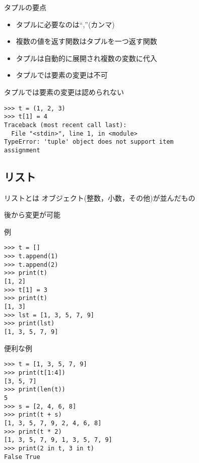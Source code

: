 \documentclass[12pt, xetex, xcolor=pdftex, dvipsnames]{beamer}
\begin{document}
\begin{frame}{タプルの要点}
    \begin{itemize}
        \item タプルに必要なのは``,''(カンマ)
        \item 複数の値を返す関数はタプルを一つ返す関数
        \item タプルは自動的に展開され複数の変数に代入
        \item \alert{タプルでは要素の変更は不可}
    \end{itemize}
\end{frame}
\begin{frame}[fragile]
    \alert{タプルでは要素の変更は認められない}
\begin{lstlisting}
>>> t = (1, 2, 3)
>>> t[1] = 4
Traceback (most recent call last):
  File "<stdin>", line 1, in <module>
TypeError: 'tuple' object does not support item
assignment
\end{lstlisting}
\end{frame}

\subsection{リスト}
\begin{frame}{リストとは}
    オブジェクト(整数，小数，その他)が並んだもの

    後から変更が可能
\end{frame}
\begin{frame}[fragile]{例}
    \begin{lstlisting}
>>> t = []
>>> t.append(1)
>>> t.append(2)
>>> print(t)
[1, 2]
>>> t[1] = 3
>>> print(t)
[1, 3]
>>> lst = [1, 3, 5, 7, 9]
>>> print(lst)
[1, 3, 5, 7, 9]
    \end{lstlisting}
\end{frame}
\begin{frame}[fragile]{便利な例}
    \begin{lstlisting}
>>> t = [1, 3, 5, 7, 9]
>>> print(t[1:4])
[3, 5, 7]
>>> print(len(t))
5
>>> s = [2, 4, 6, 8]
>>> print(t + s)
[1, 3, 5, 7, 9, 2, 4, 6, 8]
>>> print(t * 2)
[1, 3, 5, 7, 9, 1, 3, 5, 7, 9]
>>> print(2 in t, 3 in t)
False True
    \end{lstlisting}
\end{frame}
\end{document}

